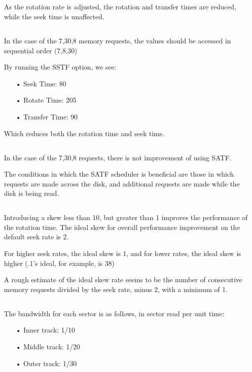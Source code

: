 \documentclass[]{scrartcl}
\begin{document}
\subsection{}
As the rotation rate is adjusted, the rotation and transfer times are reduced, while the seek time is unaffected.

\subsection{}
In the case of the 7,30,8 memory requests, the values should be accessed in sequential order (7,8,30)

By running the SSTF option, we see:
\begin{itemize}
\item[•] Seek Time: 80
\item[•] Rotate Time: 205
\item[•] Transfer Time: 90
\end{itemize}
Which reduces both the rotation time and seek time.

\subsection{}
In the case of the 7,30,8 requests, there is not improvement of using SATF.

The conditions in which the SATF scheduler is beneficial are those in which requests are made across the disk, and additional requests are made while the disk is being read.

\subsection{}
Introducing a skew less than 10, but greater than 1 improves the performance of the rotation time. The ideal skew for overall performance improvement on the default seek rate is 2.

For higher seek rates, the ideal skew is 1, and for lower rates, the ideal skew is higher (.1's ideal, for example, is 38)

A rough estimate of the ideal skew rate seems to be the number of consecutive memory requests divided by the seek rate, minus 2, with a minimum of 1.

\subsection{}
The bandwidth for each sector is as follows, in sector read per unit time:
\begin{itemize}
\item[•] Inner track: 1/10
\item[•] Middle track: 1/20
\item[•] Outer track: 1/30
\end{itemize}
\end{document}
